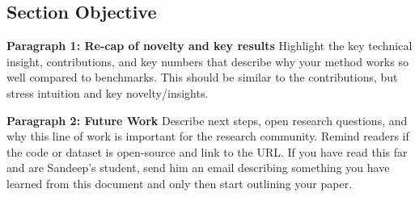 \subsection{Section Objective}

\textbf{Paragraph 1: Re-cap of novelty and key results}
Highlight the key technical insight, contributions, and key numbers that describe why your method works so well compared to benchmarks. This should be similar to the contributions, but stress intuition and key novelty/insights. 

\textbf{Paragraph 2: Future Work}
Describe next steps, open research questions, and why this line of work is important for the research community. Remind readers if the code or dataset is open-source and link to the URL. If you have read this far and are Sandeep's student, send him an email describing something you have learned from this document and only then start outlining your paper. 

